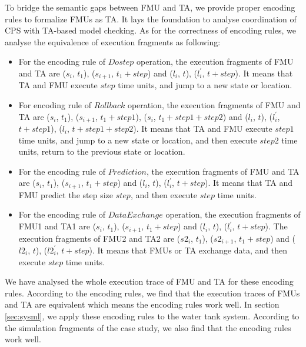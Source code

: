 To bridge the semantic gaps between FMU and TA, we provide proper encoding rules to formalize FMUs as TA. It lays the foundation to analyse coordination of CPS with TA-based model checking. 
As for the correctness of encoding rules, we analyse the equivalence of execution fragments as following:
\begin{itemize}
\item
For the encoding rule of $Dostep$ operation, the execution fragments of FMU and TA are ($s_{i}$, $t_{1}$), ($s_{i+1}$, $t_{1}+step$) and ($l_{i}$, $t$), ($l_{i}^{\prime}$, $t+step$). It means that TA and FMU execute $step$ time units, and jump to a new state or location.
\item 
For encoding rule of $Rollback$ operation, the execution fragments of FMU and TA are ($s_{i}$, $t_{1}$), ($s_{i+1}$, $t_{1}+step1$), ($s_{i}$, $t_{1}+step1+step2$) and ($l_{i}$, $t$), ($l_{i}^{\prime}$, $t+step1$), ($l_{i}$, $t+step1+step2$). It means that TA and FMU execute $step1$ time units, and jump to a new state or location, and then execute $step2$ time units, return to the previous state or location. 
\item
For the encoding rule of $Prediction$, the execution fragments of FMU and TA are ($s_{i}$, $t_{1}$), ($s_{i+1}$, $t_{1}+step$) and ($l_{i}$, $t$), ($l_{i}^{\prime}$, $t+step$). It means that TA and FMU predict the step size $step$, and then execute $step$ time units.
\item
For the encoding rule of $Data Exchange$ operation, the execution fragments of FMU1 and TA1 are ($s_{i}$, $t_{1}$), ($s_{i+1}$, $t_{1}+step$) and ($l_{i}$, $t$), ($l_{i}^{\prime}$, $t+step$). The execution fragments of FMU2 and TA2 are ($s2_{i}$, $t_{1}$), ($s2_{i+1}$, $t_{1}+step$) and ($l2_{i}$, $t$), ($l2_{i}^{\prime}$, $t+step$). It means that FMUs or TA exchange data, and then execute $step$ time units.
\end{itemize}
We have analysed the whole execution trace of FMU and TA for these encoding rules. According to the encoding rules, we find that the execution traces of FMUs and TA are equivalent which means the encoding rules work well. In section \ref{sec:sysml}, we apply these encoding rules to the water tank system. According to the simulation fragments of the case study, we also find that the encoding rules work well.